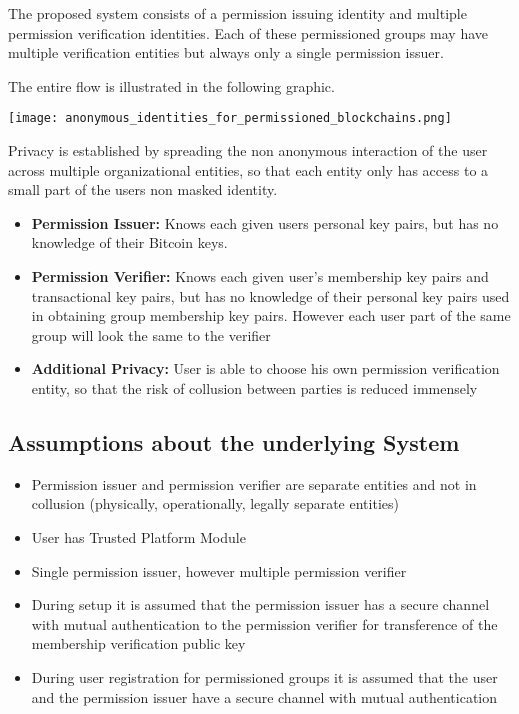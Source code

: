 The proposed system consists of a permission issuing identity and multiple permission verification identities. Each of these permissioned groups may have multiple verification entities but always only a single permission issuer.\cite[p.5]{hardjono2016anonymous}

The entire flow is illustrated in the following graphic.

 \texttt{[image: anonymous\_identities\_for\_permissioned\_blockchains.png]}

Privacy is established by spreading the non anonymous interaction of the user across multiple organizational entities, so that each entity only has access to a small part of the users non masked identity.\cite[p.4-5]{hardjono2016anonymous}
\begin{itemize}
\item \textbf{Permission Issuer:}
Knows each given users personal key pairs, but has no knowledge of their Bitcoin keys.
\item \textbf{Permission Verifier:}
Knows each given user's membership key pairs and transactional key pairs, but has no knowledge of their personal key pairs used in obtaining group membership key pairs. However each user part of the same group will look the same to the verifier
\item \textbf{Additional Privacy:}
User is able to choose his own permission verification entity, so that the risk of collusion between parties is reduced immensely
\end{itemize}

\subsection{Assumptions about the underlying System}
\begin{itemize}
\item Permission issuer and permission verifier are separate entities and not in collusion (physically, operationally, legally separate entities)\cite[p.4]{hardjono2016anonymous}
\item User has Trusted Platform Module\cite[p.2-3]{hardjono2016anonymous}
\item Single permission issuer, however multiple permission verifier\cite[p.5]{hardjono2016anonymous}
\item During setup it is assumed that the permission issuer has a secure channel with mutual authentication to the permission verifier for transference of the membership verification public key\cite[p.5]{hardjono2016anonymous}
\item During user registration for permissioned groups it is assumed that the user and the permission issuer have a secure channel with mutual authentication\cite[p.6]{hardjono2016anonymous}
\end{itemize}

